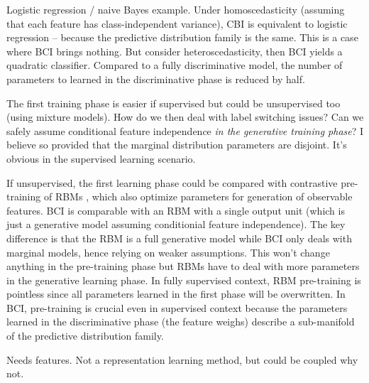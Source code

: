 \documentclass[english]{scrartcl}
\begin{document}
Logistic regression / naive Bayes example. Under homoscedasticity (assuming that each feature has class-independent variance), CBI is equivalent to logistic regression -- because the predictive distribution family is the same. This is a case where BCI brings nothing. But consider heteroscedasticity, then BCI yields a quadratic classifier. Compared to a fully discriminative model, the number of parameters to learned in the discriminative phase is reduced by half.

The first training phase is easier if supervised but could be unsupervised too (using mixture models). How do we then deal with label switching issues? Can we safely assume conditional feature independence {\em in the generative training phase}? I believe so provided that the marginal distribution parameters are disjoint. It's obvious in the supervised learning scenario.

If unsupervised, the first learning phase could be compared with contrastive pre-training of RBMs \cite{Hinton-06,Fischer-14}, which also optimize parameters for generation of observable features. BCI is comparable with an RBM with a single output unit (which is just a generative model assuming conditionial feature independence). The key difference is that the RBM is a full generative model while BCI only deals with marginal models, hence relying on weaker assumptions. This won't change anything in the pre-training phase but RBMs have to deal with more parameters in the generative learning phase. In fully supervised context, RBM pre-training is pointless since all parameters learned in the first phase will be overwritten. In BCI, pre-training is crucial even in supervised context because the parameters learned in the discriminative phase (the feature weighs) describe a sub-manifold of the predictive distribution family.

Needs features. Not a representation learning method, but could be coupled why not.



\end{document}
